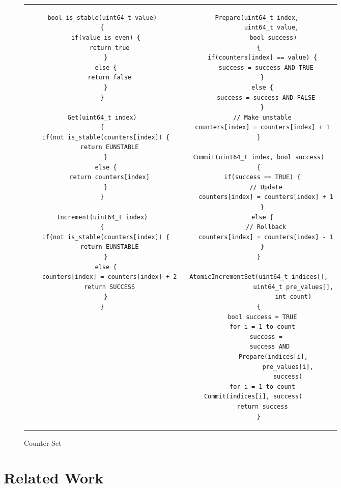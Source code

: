 \documentclass[twocolumn]{article}
\begin{document}
\begin{figure*}
\begin{tabular}{cc}    
\begin{minipage}{0.5\textwidth}  
{ \scriptsize
\begin{verbatim}
bool is_stable(uint64_t value)
{
  if(value is even) {
    return true
  }
  else {
    return false
  }
}

Get(uint64_t index)
{
  if(not is_stable(counters[index]) {
    return EUNSTABLE
  }
  else {
    return counters[index]
  }
}

Increment(uint64_t index)
{
  if(not is_stable(counters[index]) {
    return EUNSTABLE
  }
  else {
    counters[index] = counters[index] + 2
    return SUCCESS
  }
}
\end{verbatim}
}
\end{minipage} &
\begin{minipage}{0.5\textwidth}  
{ \scriptsize
\begin{verbatim}
Prepare(uint64_t index, 
        uint64_t value, 
        bool success)
{
  if(counters[index] == value) {
    success = success AND TRUE
  }
  else {
    success = success AND FALSE
  }
  // Make unstable
  counters[index] = counters[index] + 1
}

Commit(uint64_t index, bool success)
{
  if(success == TRUE) {
    // Update
    counters[index] = counters[index] + 1
  }
  else {
    // Rollback
    counters[index] = counters[index] - 1
  }
}

AtomicIncrementSet(uint64_t indices[],
                   uint64_t pre_values[],
                   int count)
{
  bool success = TRUE
  for i = 1 to count
    success =
      success AND
        Prepare(indices[i],
                pre_values[i],
                success)
  for i = 1 to count
    Commit(indices[i], success)       
  return success
}
\end{verbatim}
}
\end{minipage}
\end{tabular}
\caption{Counter Set}
\label{fig:counter_set}
\end{figure*}

\section{Related Work}
\end{document}
